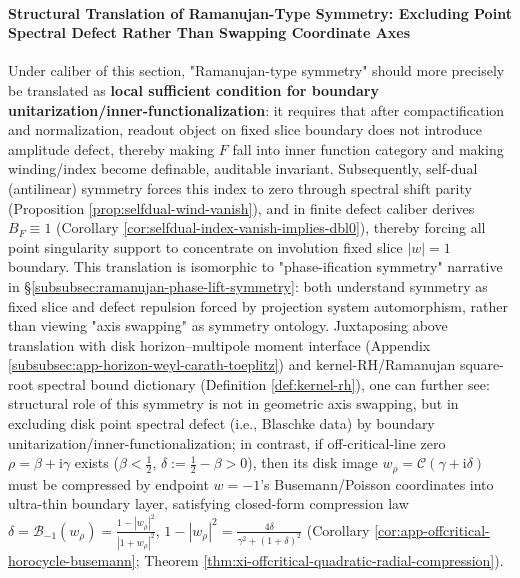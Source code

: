 \paragraph{Structural Translation of Ramanujan-Type Symmetry: Excluding Point Spectral Defect Rather Than Swapping Coordinate Axes}
Under caliber of this section, "Ramanujan-type symmetry" should more precisely be translated as \textbf{local sufficient condition for boundary unitarization/inner-functionalization}: it requires that after compactification and normalization, readout object on fixed slice boundary does not introduce amplitude defect, thereby making \(F\) fall into inner function category and making winding/index become definable, auditable invariant. Subsequently, self-dual (antilinear) symmetry forces this index to zero through spectral shift parity (Proposition \ref{prop:selfdual-wind-vanish}), and in finite defect caliber derives \(B_F\equiv 1\) (Corollary \ref{cor:selfdual-index-vanish-implies-dbl0}), thereby forcing all point singularity support to concentrate on involution fixed slice \(|w|=1\) boundary.
This translation is isomorphic to "phase-ification symmetry" narrative in \S\ref{subsubsec:ramanujan-phase-lift-symmetry}: both understand symmetry as fixed slice and defect repulsion forced by projection system automorphism, rather than viewing "axis swapping" as symmetry ontology.
Juxtaposing above translation with disk horizon–multipole moment interface (Appendix \ref{subsubsec:app-horizon-weyl-carath-toeplitz}) and kernel-RH/Ramanujan square-root spectral bound dictionary (Definition \ref{def:kernel-rh}), one can further see: structural role of this symmetry is not in geometric axis swapping, but in excluding disk point spectral defect (i.e., Blaschke data) by boundary unitarization/inner-functionalization; in contrast, if off-critical-line zero \(\rho=\beta+\mathrm{i}\gamma\) exists (\(\beta<\tfrac12\), \(\delta:=\tfrac12-\beta>0\)), then its disk image \(w_\rho=\mathcal{C}(\gamma+\mathrm{i}\delta)\) must be compressed by endpoint \(w=-1\)'s Busemann/Poisson coordinates into ultra-thin boundary layer, satisfying closed-form compression law \(\delta=\mathcal{B}_{-1}(w_\rho)=\frac{1-|w_\rho|^2}{|1+w_\rho|^2}\), \(1-|w_\rho|^2=\frac{4\delta}{\gamma^2+(1+\delta)^2}\) (Corollary \ref{cor:app-offcritical-horocycle-busemann}; Theorem \ref{thm:xi-offcritical-quadratic-radial-compression}).

